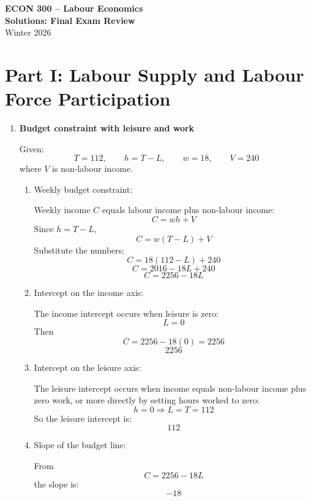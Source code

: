 \documentclass[12pt]{article}
\begin{document}
\begin{center}
{\LARGE \textbf{ECON 300 -- Labour Economics}}\\[0.8em]
{\Large \textbf{Solutions: Final Exam Review}}\\[0.8em]
{\Large Winter 2026}
\end{center}

\vspace{0.5em}

\section*{Part I: Labour Supply and Labour Force Participation}

\begin{enumerate}

\item \textbf{Budget constraint with leisure and work}

Given:
\[
T=112,\qquad h=T-L,\qquad w=18,\qquad V=240
\]
where \(V\) is non-labour income.

\begin{enumerate}[label=(\alph*)]
    \item Weekly budget constraint:

    Weekly income \(C\) equals labour income plus non-labour income:
    \[
    C=w h + V
    \]
    Since \(h=T-L\),
    \[
    C=w(T-L)+V
    \]
    Substitute the numbers:
    \[
    C=18(112-L)+240
    \]
    \[
    C=2016-18L+240
    \]
    \[
    \boxed{C=2256-18L}
    \]

    \item Intercept on the income axis:

    The income intercept occurs when leisure is zero:
    \[
    L=0
    \]
    Then
    \[
    C=2256-18(0)=2256
    \]
    \[
    \boxed{2256}
    \]

    \item Intercept on the leisure axis:

    The leisure intercept occurs when income equals non-labour income plus zero work, or more directly by setting hours worked to zero:
    \[
    h=0 \Rightarrow L=T=112
    \]
    So the leisure intercept is:
    \[
    \boxed{112}
    \]

    \item Slope of the budget line:

    From
    \[
    C=2256-18L
    \]
    the slope is:
    \[
    \boxed{-18}
    \]


\end{enumerate}
\end{enumerate}
\end{document}
